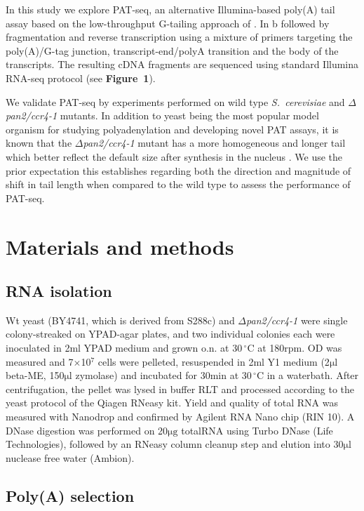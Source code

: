 \documentclass[10pt]{article}
\newcommand{\mul}{\ensuremath{\mathrm{\mu l}} }
\newcommand{\C}{\,$^{\circ}\mathrm{C}$ }
\begin{document}
In this study we explore PAT-seq, an alternative Illumina-based poly(A) tail assay based on the low-throughput G-tailing approach of \cite{kusov01}. In b followed by fragmentation and reverse transcription using a mixture of primers targeting the poly(A)/G-tag junction, transcript-end/polyA transition and the body of the transcripts. The resulting cDNA fragments are sequenced using standard Illumina RNA-seq protocol (see \textbf{Figure~1}).

We validate PAT-seq by experiments performed on wild type \textit{S.~cerevisiae} and \textit{$\Delta$pan2/ccr4-1} mutants. In addition to yeast being the most popular model organism for studying polyadenylation and developing novel PAT assays, it is known that the \textit{$\Delta$pan2/ccr4-1} mutant has a more homogeneous and longer tail which better reflect the default size after synthesis in the nucleus \cite{beilharz07,traven05}. We use the prior expectation this establishes regarding both the direction and magnitude of shift in tail length when compared to the wild type to assess the performance of PAT-seq.

\section*{Materials and methods}

\subsection*{RNA isolation}

Wt yeast (BY4741, which is derived from S288c) and \textit{$\Delta$pan2/ccr4-1} \cite{beilharz07} were single colony-streaked on YPAD-agar plates, and two individual colonies each were inoculated in 2ml YPAD medium and grown o.n. at 30\C at 180rpm. OD was measured and 7$\times$10$^7$ cells were pelleted, resuspended in 2ml Y1 medium (2\mul beta-ME, 150\mul zymolase) and incubated for 30min at 30\C in a waterbath. After centrifugation, the pellet was lysed in buffer RLT and processed according to the yeast protocol of the Qiagen RNeasy kit. Yield and quality of total RNA was measured with Nanodrop and confirmed by Agilent RNA Nano chip (RIN 10). A DNase digestion was performed on 20$\mathrm{\mu g}$ totalRNA using Turbo DNase (Life Technologies), followed by an RNeasy column cleanup step and elution into 30\mul nuclease free water (Ambion).

\subsection*{Poly(A) selection}
\end{document}
